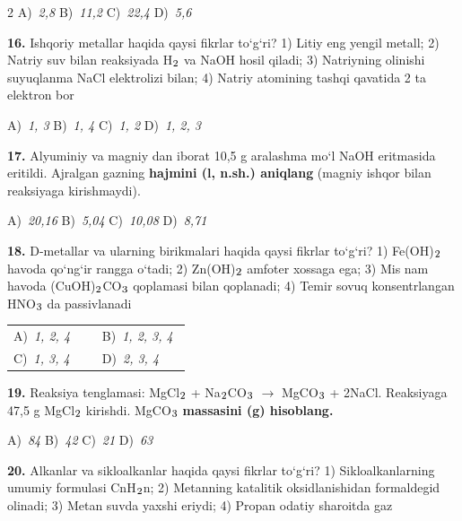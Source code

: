 \documentclass[11pt,a4paper]{article}
\renewcommand{\textsubscript}[1]{\ensuremath{_{\text{\fontsize{8}{8}\selectfont #1}}}}
\begin{document}
\begin{multicols}{2}
\noindent A)~\textsl{2,8} \hfill B)~\textsl{11,2} \hfill C)~\textsl{22,4} \hfill D)~\textsl{5,6}\par
\vspace{4pt}
\noindent\textbf{16.} Ishqoriy metallar haqida qaysi fikrlar to`g`ri? 1) Litiy eng yengil metall; 2) Natriy suv bilan reaksiyada H\textsubscript{2} va NaOH hosil qiladi; 3) Natriyning olinishi suyuqlanma NaCl elektrolizi bilan; 4) Natriy atomining tashqi qavatida 2 ta elektron bor

\noindent A)~\textsl{1, 3} \hfill B)~\textsl{1, 4} \hfill C)~\textsl{1, 2} \hfill D)~\textsl{1, 2, 3}\par
\vspace{4pt}
\noindent\textbf{17.} Alyuminiy va magniy dan iborat 10,5 g aralashma mo`l NaOH eritmasida eritildi. Ajralgan gazning \textbf{hajmini (l, n.sh.) aniqlang} (magniy ishqor bilan reaksiyaga kirishmaydi).

\noindent A)~\textsl{20,16} \hfill B)~\textsl{5,04} \hfill C)~\textsl{10,08} \hfill D)~\textsl{8,71}\par
\vspace{4pt}
\noindent\textbf{18.} D-metallar va ularning birikmalari haqida qaysi fikrlar to`g`ri? 1) Fe(OH)\textsubscript{2} havoda qo`ng`ir rangga o`tadi; 2) Zn(OH)\textsubscript{2} amfoter xossaga ega; 3) Mis nam havoda (CuOH)\textsubscript{2}CO\textsubscript{3} qoplamasi bilan qoplanadi; 4) Temir sovuq konsentrlangan HNO\textsubscript{3} da passivlanadi

\noindent\begin{tabular}{@{}p{0.47\linewidth}@{}p{0.47\linewidth}@{}}
A)~\textsl{1, 2, 4} & B)~\textsl{1, 2, 3, 4} \\
C)~\textsl{1, 3, 4} & D)~\textsl{2, 3, 4} \\
\end{tabular}\par
\vspace{4pt}
\noindent\textbf{19.} Reaksiya tenglamasi: MgCl\textsubscript{2} + Na\textsubscript{2}CO\textsubscript{3} $\to$ MgCO\textsubscript{3} + 2NaCl. Reaksiyaga 47,5 g MgCl\textsubscript{2} kirishdi. MgCO\textsubscript{3} \textbf{massasini (g) hisoblang.}

\noindent A)~\textsl{84} \hfill B)~\textsl{42} \hfill C)~\textsl{21} \hfill D)~\textsl{63}\par
\vspace{4pt}
\noindent\textbf{20.} Alkanlar va sikloalkanlar haqida qaysi fikrlar to`g`ri? 1) Sikloalkanlarning umumiy formulasi CnH\textsubscript{2}n; 2) Metanning katalitik oksidlanishidan formaldegid olinadi; 3) Metan suvda yaxshi eriydi; 4) Propan odatiy sharoitda gaz


\end{multicols}
\end{document}
